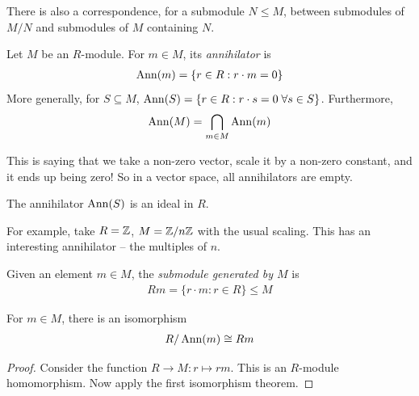 \documentclass{../../template/note}
\begin{document}
    There is also a correspondence, for a submodule $N \leq M$, between submodules of $M/N$ and submodules of $M$ containing $N$.

    \begin{definition}[Annihilators]
        Let $M$ be an $R$-module. For $m \in M$, its \emph{annihilator} is
        \begin{align*}
            \operatorname{Ann}(m) = \{r \in R: r \cdot m = 0\}
        \end{align*}
        More generally, for $S \subseteq M$, $\operatorname{Ann}(S) = \{r \in R: r \cdot s = 0 \;\forall s \in S\}$. Furthermore,
        \begin{align*}
            \operatorname{Ann}(M) = \bigcap_{m\in M} \operatorname{Ann}(m)
        \end{align*}
    \end{definition}
    
    \begin{remark*}
        This is saying that we take a non-zero vector, scale it by a non-zero constant, and it ends up being zero! So in a vector space, all annihilators are empty.
    \end{remark*}

    \begin{remark*}
        The annihilator $\operatorname{Ann}(S)$ is an ideal in $R$.
    \end{remark*}
    
    \begin{example*}
        For example, take $R = \mathbb Z$, $M = \mathbb Z/n\mathbb Z$ with the usual scaling. This has an interesting annihilator -- the multiples of $n$.
    \end{example*}
    
    \begin{definition}
        Given an element $m \in M$, the \emph{submodule generated by $M$} is
        \begin{align*}
            Rm = \{r \cdot m: r \in R\} \leq M
        \end{align*}
    \end{definition}
    
    \begin{proposition}
        For $m \in M$, there is an isomorphism
        \begin{align*}
            R/\operatorname{Ann}(m) \cong Rm
        \end{align*}
    \end{proposition}
    
    \begin{proof}
        Consider the function $R \to M: r \mapsto rm$. This is an $R$-module homomorphism. Now apply the first isomorphism theorem.
    \end{proof}
    
\end{document}
